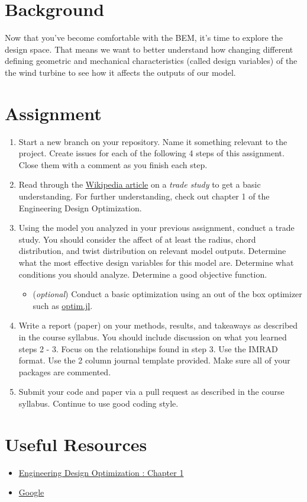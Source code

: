 \documentclass[12pt]{article}
\begin{document}
	
	\section{Background}
	
	Now that you've become comfortable with the BEM, it's time to explore the design space.
That means we want to better understand how changing different defining geometric and mechanical characteristics (called design variables) of the the wind turbine to see how it affects the outputs of our model. 
	
	
	\section{Assignment}

	\begin{enumerate}
		\item Start a new branch on your repository. Name it something relevant to the project. Create issues for each of the following 4 steps of this assignment. Close them with a comment as you finish each step. 
		\item Read  through the \href{https://en.wikipedia.org/wiki/Trade_study}{Wikipedia article} on a \textit{trade study} to get a basic understanding. For further understanding, check out chapter 1 of the Engineering Design Optimization. 
		\item Using the model you analyzed in your previous assignment, conduct a trade study. You should consider the affect of at least the radius, chord distribution, and twist distribution on relevant model outputs. Determine what the most effective design variables for this model are. Determine what conditions you should analyze. Determine a good objective function.
		\begin{itemize}
			\item (\textit{optional}) Conduct a basic optimization using an out of the box optimizer such as \href{https://github.com/JuliaNLSolvers/Optim.jl}{optim.jl}. 
		\end{itemize}
		\item Write a report (paper) on your methods, results, and takeaways as described in the course syllabus. You should include discussion on what you learned steps 2 - 3.  Focus on the relationships found in step 3.  Use the IMRAD format. Use the 2 column journal template provided. Make sure all of your packages are commented. 
		\item Submit your code and paper via a pull request as described in the course syllabus. Continue to use good coding style. 
	\end{enumerate}
	
	\bigskip
	

	
	
	\section{Useful Resources}
	\begin{multicols}{2}
	\begin{itemize}
    		\item \href{http://flowlab.groups.et.byu.net/mdobook.pdf}{Engineering Design Optimization : Chapter 1}
    		\item \href{https://www.google.com/}{Google}
	\end{itemize}
	\end{multicols}
	
	
	
	
	
	
\end{document}
